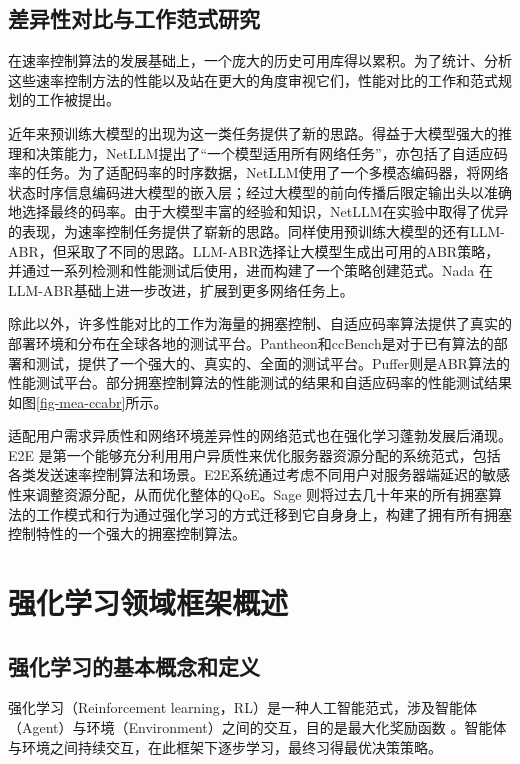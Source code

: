 \subsection{差异性对比与工作范式研究}
在速率控制算法的发展基础上，一个庞大的历史可用库得以累积。为了统计、分析这些速率控制方法的性能以及站在更大的角度审视它们，性能对比的工作和范式规划的工作被提出。

近年来预训练大模型的出现为这一类任务提供了新的思路。得益于大模型强大的推理和决策能力，NetLLM\cite{wu2024netllm}提出了“一个模型适用所有网络任务”，亦包括了自适应码率的任务。为了适配码率的时序数据，NetLLM使用了一个多模态编码器，将网络状态时序信息编码进大模型的嵌入层；经过大模型的前向传播后限定输出头以准确地选择最终的码率。由于大模型丰富的经验和知识，NetLLM在实验中取得了优异的表现，为速率控制任务提供了崭新的思路。同样使用预训练大模型的还有LLM-ABR\cite{he2024llm}，但采取了不同的思路。LLM-ABR选择让大模型生成出可用的ABR策略，并通过一系列检测和性能测试后使用，进而构建了一个策略创建范式。Nada\cite{he2024designing} 在LLM-ABR基础上进一步改进，扩展到更多网络任务上。


除此以外，许多性能对比的工作为海量的拥塞控制、自适应码率算法提供了真实的部署环境和分布在全球各地的测试平台。Pantheon\cite{yan2018pantheon}和ccBench\cite{abbasloo2023internet}是对于已有算法的部署和测试，提供了一个强大的、真实的、全面的测试平台。Puffer\cite{yan2020learning}则是ABR算法的性能测试平台。部分拥塞控制算法的性能测试的结果和自适应码率的性能测试结果如图\ref{fig-mea-ccabr}所示。



适配用户需求异质性和网络环境差异性的网络范式也在强化学习蓬勃发展后涌现。E2E \cite{zhang2019e2e}是第一个能够充分利用用户异质性来优化服务器资源分配的系统范式，包括各类发送速率控制算法和场景。E2E系统通过考虑不同用户对服务器端延迟的敏感性来调整资源分配，从而优化整体的QoE。Sage\cite{yen2023computers} 则将过去几十年来的所有拥塞算法的工作模式和行为通过强化学习的方式迁移到它自身身上，构建了拥有所有拥塞控制特性的一个强大的拥塞控制算法。

\section{强化学习领域框架概述}
\subsection{强化学习的基本概念和定义}
强化学习（Reinforcement learning，RL）是一种人工智能范式，涉及智能体（Agent）与环境（Environment）之间的交互，目的是最大化奖励函数 \cite{mnih2015human}。智能体与环境之间持续交互，在此框架下逐步学习，最终习得最优决策策略。

